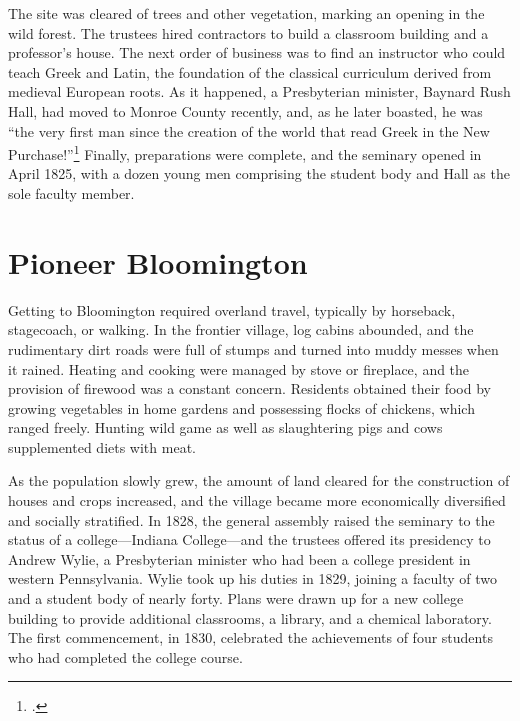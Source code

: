 \documentclass[
  american,
  letterpaper,
]{scrreprt}
\begin{document}
The site was cleared of trees and other vegetation, marking an opening
in the wild forest. The trustees hired contractors to build a classroom
building and a professor's house. The next order of business was to find
an instructor who could teach Greek and Latin, the foundation of the
classical curriculum derived from medieval European roots. As it
happened, a Presbyterian minister, Baynard Rush Hall, had moved to
Monroe County recently, and, as he later boasted, he was ``the very
first man since the creation of the world that read Greek in the New
Purchase!''\footnote{.} Finally, preparations were complete,
and the seminary opened in April 1825, with a dozen young men comprising
the student body and Hall as the sole faculty member.

\section{Pioneer Bloomington}\label{pioneer-bloomington}

Getting to Bloomington required overland travel, typically by horseback,
stagecoach, or walking. In the frontier village, log cabins abounded,
and the rudimentary dirt roads were full of stumps and turned into muddy
messes when it rained. Heating and cooking were managed by stove or
fireplace, and the provision of firewood was a constant concern.
Residents obtained their food by growing vegetables in home gardens and
possessing flocks of chickens, which ranged freely. Hunting wild game as
well as slaughtering pigs and cows supplemented diets with meat.

As the population slowly grew, the amount of land cleared for the
construction of houses and crops increased, and the village became more
economically diversified and socially stratified. In 1828, the general
assembly raised the seminary to the status of a college---Indiana
College---and the trustees offered its presidency to Andrew Wylie, a
Presbyterian minister who had been a college president in western
Pennsylvania. Wylie took up his duties in 1829, joining a faculty of two
and a student body of nearly forty. Plans were drawn up for a new
college building to provide additional classrooms, a library, and a
chemical laboratory. The first commencement, in 1830, celebrated the
achievements of four students who had completed the college course.
\end{document}
